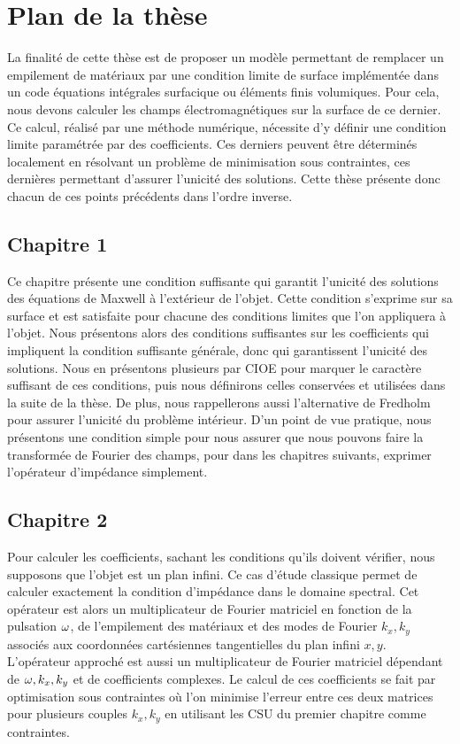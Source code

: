 \section*{Plan de la thèse}

La finalité de cette thèse est de proposer un modèle permettant de remplacer un empilement de matériaux par une condition limite de surface implémentée dans un code équations intégrales surfacique ou éléments finis volumiques. Pour cela, nous devons calculer les champs électromagnétiques sur la surface de ce dernier. Ce calcul, réalisé par une méthode numérique, nécessite d'y définir une condition limite paramétrée par des coefficients. Ces derniers peuvent être déterminés localement en résolvant un problème de minimisation sous contraintes, ces dernières permettant d'assurer l'unicité des solutions. Cette thèse présente donc chacun de ces points précédents dans l'ordre inverse.

\subsection*{Chapitre 1}
Ce chapitre présente une condition suffisante qui garantit l'unicité des solutions des équations de Maxwell à l'extérieur de l'objet.
Cette condition s'exprime sur sa surface et est satisfaite pour chacune des conditions limites que l'on appliquera à l'objet. 
Nous présentons alors des conditions suffisantes sur les coefficients qui impliquent la condition suffisante générale, donc qui garantissent l'unicité des solutions.
Nous en présentons plusieurs par CIOE pour marquer le caractère suffisant de ces conditions, puis nous définirons celles conservées et utilisées dans la suite de la thèse.
De plus, nous rappellerons aussi l'alternative de Fredholm pour assurer l'unicité du problème intérieur. D'un point de vue pratique, nous présentons une condition simple pour nous assurer que nous pouvons faire la transformée de Fourier des champs, pour dans les chapitres suivants, exprimer l'opérateur d'impédance simplement.

\subsection*{Chapitre 2}
Pour calculer les coefficients, sachant les conditions qu'ils doivent vérifier, nous supposons que l'objet est un plan infini. Ce cas d'étude classique permet de calculer exactement la condition d’impédance dans le domaine spectral. 
Cet opérateur est alors un multiplicateur de Fourier matriciel en fonction de la pulsation \(\omega\), de l'empilement des matériaux et des modes de Fourier \(k_x,k_y\) associés aux coordonnées cartésiennes tangentielles du plan infini \(x,y\).
L'opérateur approché est aussi un multiplicateur de Fourier matriciel dépendant de \(\omega, k_x, k_y\) et de coefficients complexes.
Le calcul de ces coefficients se fait par optimisation sous contraintes où l'on minimise l'erreur entre ces deux matrices pour plusieurs couples \(k_x,k_y\) en utilisant les CSU du premier chapitre comme contraintes.

